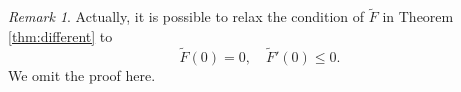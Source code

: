 \documentclass[12pt,reqno]{amsart}
\numberwithin{equation}{section}
\newtheorem{theorem}{Theorem}[section]
\theoremstyle{definition}
\theoremstyle{remark}
\newtheorem{remark}[theorem]{Remark}
\begin{document}
\begin{remark}
Actually, it is possible to relax the condition of $ \tilde F $ in Theorem \ref{thm:different} to 
\begin{equation*}
\tilde F(0)=0, \quad \tilde F'(0)\leq 0.
\end{equation*}
We omit the proof here.
\end{remark}
\end{document}
